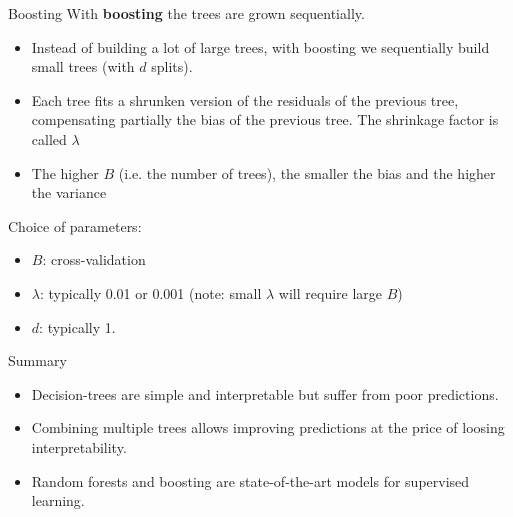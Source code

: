 \documentclass[notes]{beamer}          %
\begin{document}
\begin{frame}{Boosting}
With \textbf{boosting} the trees are grown sequentially.
\begin{itemize}
\item Instead of building a lot of large trees, with boosting we sequentially build small trees (with $d$ splits).
\item Each tree fits a shrunken version of the residuals of the previous tree, compensating partially the bias of the previous tree. The shrinkage factor is called $\lambda$
\item The higher $B$ (i.e. the number of trees), the smaller the bias and the higher the variance
\end{itemize}

Choice of parameters:

\begin{itemize}
\item $B$: cross-validation
\item $\lambda$: typically 0.01 or 0.001 (note: small $\lambda$ will require large $B$)
\item $d$: typically 1.
\end{itemize}


\end{frame}

\begin{frame}{Summary}
\begin{itemize}
\item Decision-trees are simple and interpretable but suffer from poor predictions.
\item Combining multiple trees allows improving predictions at the price of loosing interpretability.
\item Random forests and boosting are state-of-the-art models for supervised learning.
\end{itemize}
\end{frame}
\end{document}
